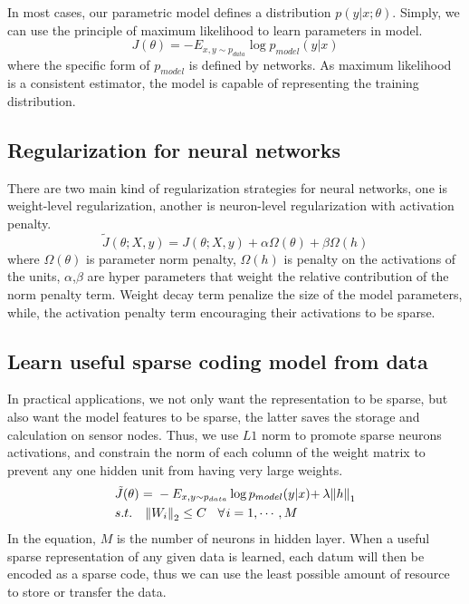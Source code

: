In most cases, our parametric model defines a distribution $p(y|x;\theta)$. Simply, we can use the principle of maximum likelihood to learn parameters in model.
\begin{equation}
J(\theta ) =  - {E_{x,y \sim {p_{data}}}}\log {p_{model}}(y|x)
\end{equation}
where the specific form of $p_{model}$ is defined by networks.
As maximum likelihood is a consistent estimator, the model is capable of representing the training distribution.

\subsection{Regularization for neural networks}

There are two main kind of regularization strategies for neural networks, one is weight-level regularization, another is neuron-level regularization with activation penalty.
\begin{equation}
\tilde J(\theta ;X,y) = J(\theta ;X,y) + \alpha \Omega (\theta )+ \beta \Omega (h)
\end{equation}
where $\Omega (\theta )$ is parameter norm penalty, $\Omega (h)$ is penalty on the activations of the units, $\alpha$,$\beta$ are hyper parameters that weight the relative contribution of
the norm penalty term. Weight decay term penalize the size of the model parameters, while, the activation penalty term encouraging their activations to be sparse.

\subsection{Learn useful sparse coding model from data}
In practical applications, we not only want the representation to be sparse, but also want the model features to be sparse, the latter saves the storage and calculation on sensor nodes. Thus, we use $L1$ norm to promote sparse neurons activations, and constrain the norm of each column of the weight matrix to prevent any one hidden unit from having very large weights.
\begin{equation}
\begin{split}
&\tilde J(\theta ){\kern 1pt} {\kern 1pt} {\kern 1pt} {\rm{ = }}{\kern 1pt} {\kern 1pt} {\kern 1pt}  - {E_{x,y \sim {p_{data}}}}\log {p_{model}}(y|x){\rm{ + }}{\kern 1pt} {\kern 1pt} \lambda {\left\| h \right\|_1}\\
& s.t.{\kern 1pt} {\kern 1pt} {\kern 1pt} {\kern 1pt} {\kern 1pt} {\kern 1pt} {\kern 1pt} {\kern 1pt} {\kern 1pt} {\kern 1pt} {\left\| {{W_i}} \right\|_2} \le C{\kern 1pt} {\kern 1pt} {\kern 1pt} {\kern 1pt} {\kern 1pt} {\kern 1pt} {\kern 1pt} {\kern 1pt} {\kern 1pt} \forall {\kern 1pt} i = 1, \cdots ,M\\
\end{split}
\end{equation}
In the equation, $M$ is the number of neurons in hidden layer.
When a useful sparse representation of any given data is learned, each datum will then be encoded as a sparse code, thus we can use the least possible amount of resource to store or transfer the data.

